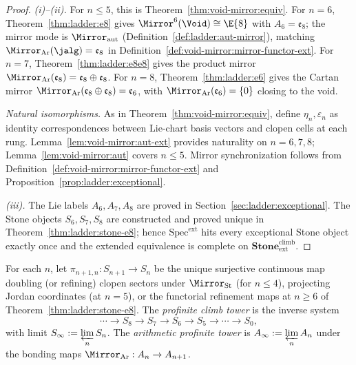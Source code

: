 \begin{proof}
\emph{(i)--(ii).} For $n\leq5$, this is Theorem~\ref{thm:void-mirror:equiv}.
For $n=6$, Theorem~\ref{thm:ladder:e8} gives
$\Mirror^6(\Void)\cong\E{8}$ with $A_6=\mathfrak{e}_8$; the mirror mode is
$\Mirror_{\mathrm{aut}}$ (Definition~\ref{def:ladder:aut-mirror}), matching
$\Mirror_{\mathrm{Ar}}(\jalg)=\mathfrak{e}_8$ in
Definition~\ref{def:void-mirror:mirror-functor-ext}. For $n=7$,
Theorem~\ref{thm:ladder:e8e8} gives the product mirror
$\Mirror_{\mathrm{Ar}}(\mathfrak{e}_8)=\mathfrak{e}_8\oplus\mathfrak{e}_8$.
For $n=8$, Theorem~\ref{thm:ladder:e6} gives the Cartan mirror
$\Mirror_{\mathrm{Ar}}(\mathfrak{e}_8\oplus\mathfrak{e}_8)=\mathfrak{e}_6$,
with $\Mirror_{\mathrm{Ar}}(\mathfrak{e}_6)=\{0\}$ closing to the void.

\emph{Natural isomorphisms.} As in Theorem~\ref{thm:void-mirror:equiv}, define
$\eta_n,\varepsilon_n$ as identity correspondences between Lie-chart basis
vectors and clopen cells at each rung. Lemma~\ref{lem:void-mirror:aut-ext}
provides naturality on $n=6,7,8$; Lemma~\ref{lem:void-mirror:aut} covers
$n\leq5$. Mirror synchronization follows from
Definition~\ref{def:void-mirror:mirror-functor-ext} and
Proposition~\ref{prop:ladder:exceptional}.

\emph{(iii).} The Lie labels $A_6,A_7,A_8$ are proved in
Section~\ref{sec:ladder:exceptional}. The Stone objects $S_6,S_7,S_8$ are
constructed and proved unique in Theorem~\ref{thm:ladder:stone-e8}; hence
$\mathrm{Spec}^{\mathrm{ext}}$ hits every exceptional Stone object exactly once
and the extended equivalence is complete on
$\mathbf{Stone}^{\mathrm{climb}}_{\mathrm{ext}}$.
\end{proof}

\begin{definition}\label{def:void-mirror:profinite}
For each $n$, let $\pi_{n+1,n}:S_{n+1}\to S_n$ be the unique surjective
continuous map doubling (or refining) clopen sectors under $\Mirror_{\mathrm{St}}$
(for $n\leq4$), projecting Jordan coordinates (at $n=5$), or the
functorial refinement maps at $n\geq6$ of
Theorem~\ref{thm:ladder:stone-e8}. The \emph{profinite climb
tower} is the inverse system
\[
  \cdots\longrightarrow S_8\longrightarrow S_7\longrightarrow S_6
  \longrightarrow S_5\longrightarrow\cdots\longrightarrow S_0,
\]
with limit $\displaystyle S_\infty:=\varprojlim_n S_n$.
The \emph{arithmetic profinite tower} is
$\displaystyle A_\infty:=\varprojlim_n A_n$ under the bonding maps
$\Mirror_{\mathrm{Ar}}:A_n\to A_{n+1}$.
\end{definition}

